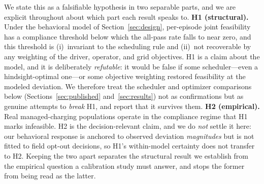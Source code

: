 \documentclass[12pt]{article}
\begin{document}
We state this as a falsifiable hypothesis in two separable parts, and we are explicit throughout about which part each result speaks to. \textbf{H1 (structural).} Under the behavioral model of Section~\ref{sec:design}, per-episode joint feasibility has a compliance threshold below which the all-pass rate falls to near zero, and this threshold is (i)~invariant to the scheduling rule and (ii)~not recoverable by any weighting of the driver, operator, and grid objectives. H1 is a claim about the model, and it is deliberately \emph{refutable}: it would be false if some scheduler---even a hindsight-optimal one---or some objective weighting restored feasibility at the modeled deviation. We therefore treat the scheduler and optimizer comparisons below (Sections~\ref{sec:published} and~\ref{sec:results}) not as confirmations but as genuine attempts to \emph{break} H1, and report that it survives them. \textbf{H2 (empirical).} Real managed-charging populations operate in the compliance regime that H1 marks infeasible. H2 is the decision-relevant claim, and we do \emph{not} settle it here: our behavioral response is anchored to observed deviation \emph{magnitudes} but is not fitted to field opt-out decisions, so H1's within-model certainty does not transfer to H2. Keeping the two apart separates the structural result we establish from the empirical question a calibration study must answer, and stops the former from being read as the latter.
\end{document}
